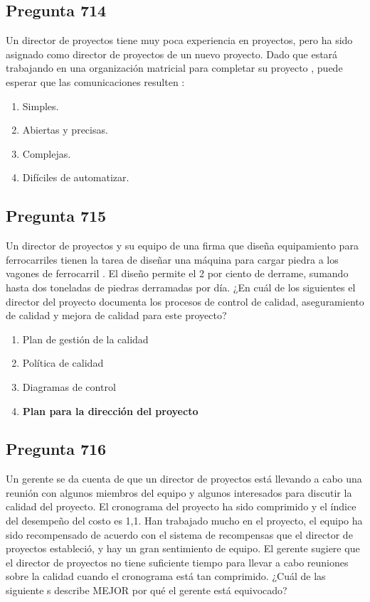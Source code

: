\documentclass[11pt,a4paper]{article}
\begin{document}
\subsection*{Pregunta 714}
Un director de proyectos tiene muy poca experiencia en proyectos, pero ha sido asignado como director de proyectos de un nuevo proyecto. Dado que estará trabajando en una organización matricial para completar su proyecto , puede esperar que las comunicaciones resulten :

\begin{enumerate}[label=\alph*)]
  \item Simples.
  \item Abiertas y precisas.
  \item Complejas.
  \item Difíciles de automatizar.
\end{enumerate}

\subsection*{Pregunta 715}
Un director de proyectos y su equipo de una firma que diseña equipamiento para ferrocarriles tienen la tarea de diseñar una máquina para cargar piedra a los vagones de ferrocarril . El diseño permite el 2 por ciento de derrame, sumando hasta dos toneladas de piedras derramadas por día. ¿En cuál de los siguientes el director del proyecto documenta los procesos de control de calidad, aseguramiento de calidad y mejora de calidad para este proyecto?

\begin{enumerate}[label=\alph*)]
  \item Plan de gestión de la calidad
  \item Política de calidad
  \item Diagramas de control
  \item \textbf{Plan para la dirección del proyecto}
\end{enumerate}

\subsection*{Pregunta 716}
Un gerente se da cuenta de que un director de proyectos está llevando a cabo una reunión con algunos miembros del equipo y algunos interesados para discutir la calidad del proyecto. El cronograma del proyecto ha sido comprimido y el índice del desempeño del costo es 1,1. Han trabajado mucho en el proyecto, el equipo ha sido recompensado de acuerdo con el sistema de recompensas que el director de proyectos estableció, y hay un gran sentimiento de equipo. El gerente sugiere que el director de proyectos no tiene suficiente tiempo para llevar a cabo reuniones sobre la calidad cuando el cronograma está tan comprimido. ¿Cuál de las siguiente s describe MEJOR por qué el gerente está equivocado?
\end{document}
